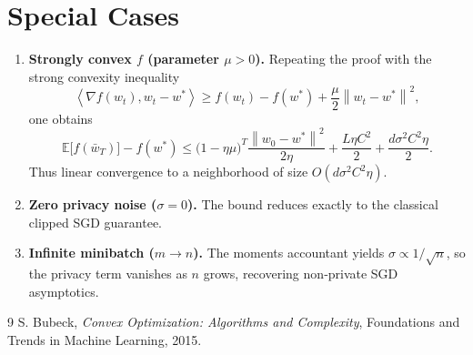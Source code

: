 \documentclass[11pt]{article}
\newcommand{\E}{\mathbb{E}}
\newcommand{\norm}[1]{\left\|#1\right\|}
\newcommand{\inner}[2]{\left\langle #1,#2\right\rangle}
\begin{document}
\section*{Special Cases}
\begin{enumerate}
\item \textbf{Strongly convex $f$ (parameter $\mu>0$).} Repeating the proof with the strong convexity inequality
\[
\inner{\nabla f(w_{t})}{w_{t}-w^{*}}\ge f(w_{t})-f(w^{*})+\frac{\mu}{2}\norm{w_{t}-w^{*}}^{2},
\]
one obtains
\[
\E\!\bigl[f(\bar w_{T})\bigr]-f(w^{*})
\le \bigl(1-\eta\mu\bigr)^{T}\frac{\norm{w_{0}-w^{*}}^{2}}{2\eta}
   +\frac{L\eta C^{2}}{2}
   +\frac{d\sigma^{2}C^{2}\eta}{2}.
\]
Thus linear convergence to a neighborhood of size $O(d\sigma^{2}C^{2}\eta)$.
\item \textbf{Zero privacy noise ($\sigma=0$).} The bound reduces exactly to the classical clipped SGD guarantee.
\item \textbf{Infinite minibatch ($m\to n$).} The moments accountant yields $\sigma\propto 1/\sqrt{n}$, so the privacy term vanishes as $n$ grows, recovering non‑private SGD asymptotics.
\end{enumerate}

\begin{thebibliography}{9}
S. Bubeck,
\textit{Convex Optimization: Algorithms and Complexity},
Foundations and Trends in Machine Learning, 2015.
\end{thebibliography}
\end{document}

